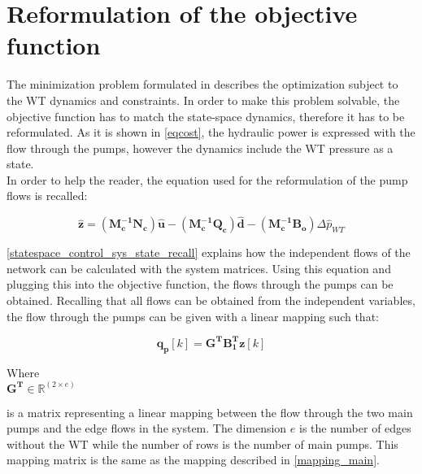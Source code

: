\section{Reformulation of the objective function}
\label{ObjFunc_reform}

The minimization problem formulated in  describes the optimization subject to the WT dynamics and constraints. In order to make this problem solvable, the objective function has to match the state-space dynamics, therefore it has to be reformulated. As it is shown in \eqref{eqcost}, the hydraulic power is expressed with the flow through the pumps, however the dynamics include the WT pressure as a state. 
\\
\newline
In order to help the reader, the equation used for the reformulation of the pump flows is recalled:

 \begin{equation}
 \pmb{\hat{z}} =   (\pmb{M_c^{-1}}\pmb{N_c}) \pmb{\hat{u}} - (\pmb{M_c^{-1}}\pmb{Q_c}) \pmb{\hat{d}} - (\pmb{M_c^{-1}}\pmb{B_o}) \Delta \hat{p}_{WT}    
 \label{statespace_control_sys_state_recall}
\end{equation}

\eqref{statespace_control_sys_state_recall} explains how the independent flows of the network can be  calculated with the system matrices. Using this equation and plugging this into the objective function, the flows through the pumps can be obtained. Recalling that all flows can be obtained from the independent variables, the flow through the pumps can be given with a linear mapping such that: 

\begin{equation}
\bm{q_p}[k]  = \bm{G^T} \bm{B_{1}^T}  \bm{z}[k]
\label{mapping_mainP}
\end{equation}

\begin{minipage}[t]{0.20\textwidth}
Where\\
\hspace*{8mm} $\bm{G^T} \in \bm{\mathbb{R}}^{(2 \times e)} $ 
\end{minipage}
\begin{minipage}[t]{0.68\textwidth}
\vspace*{2mm}
is a matrix representing a linear mapping between the flow through the two main pumps and the edge flows in the system. The dimension $e$ is the number of edges without the WT while the number of rows is the number of main pumps. This mapping matrix is the same as the mapping described in \eqref{mapping_main}.
\end{minipage} 

